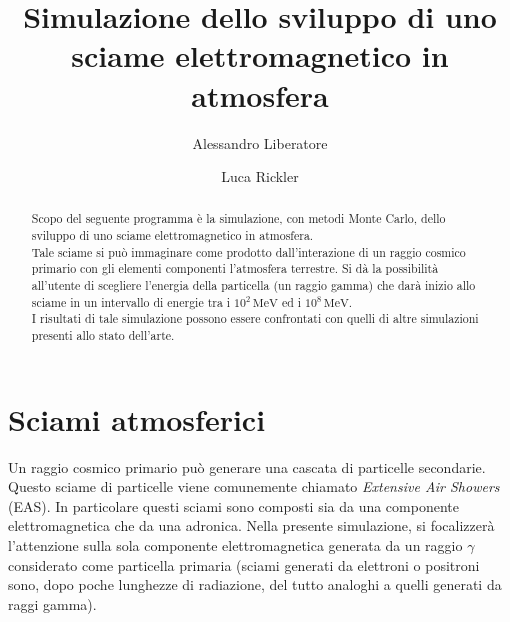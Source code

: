 \documentclass[10pt,a4paper,usenatbib]{article}
\newcommand*{\unit}[1]{\ensuremath{\mathrm{\,#1}}}                              %
\begin{document}
\author{Alessandro Liberatore \and Luca Rickler}
\title{Simulazione dello sviluppo di uno sciame elettromagnetico in atmosfera}
\maketitle


\pagebreak
\tableofcontents
\pagebreak



\pagebreak

\begin{abstract}
Scopo del seguente programma è la simulazione, con metodi Monte Carlo, dello sviluppo di uno sciame elettromagnetico in atmosfera. 
\\Tale sciame si può immaginare come prodotto dall'interazione di un raggio cosmico primario con gli elementi componenti l'atmosfera terrestre. Si dà la possibilità all'utente di scegliere l'energia della particella (un raggio gamma) che darà inizio allo sciame in un intervallo di energie tra i $10^2\unit{MeV}$ ed i $10^8\unit{MeV}$. 
\\I risultati di tale simulazione possono essere confrontati con quelli di altre simulazioni presenti allo stato dell'arte. 
\end{abstract}



\section{Sciami atmosferici}
Un raggio cosmico primario può generare una cascata di particelle secondarie. Questo sciame di particelle viene comunemente chiamato \textit{Extensive Air Showers} (EAS). In particolare questi sciami sono composti sia da una componente elettromagnetica che da una adronica. Nella presente simulazione, si focalizzerà l'attenzione sulla sola componente elettromagnetica generata da un raggio $\gamma$ considerato come particella primaria (sciami generati da elettroni o positroni sono, dopo poche lunghezze di radiazione, del tutto analoghi a quelli generati da raggi gamma). 
\end{document}
